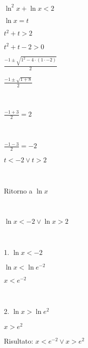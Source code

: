 \documentclass[11pt]{article}
\begin{document}
$ \ln^2{x} + \ln{x} < 2 $

$ \ln{x} = t $

$ t^2 + t > 2 $

$ t^2 + t -2 > 0 $

$ \frac{-1 \pm \sqrt{1^2 - 4 \cdot (1 \cdot - 2)}}{2} $

$ \frac{-1 \pm \sqrt{1 + 8}}{2} $

\,

$ \frac{-1 + 3}{2} = 2 $

\,

$ \frac{-1 - 3}{2} = -2 $

$ t < -2 \vee t > 2 $

\,

\pagebreak

Ritorno a $ \ln{x} $

\,

$ \ln{x} < -2 \vee \ln{x} > 2 $

\, 

1. $ \ln{x} < -2 $

$ \ln{x} < \ln{e^{-2}} $

$ x < e^{-2} $

\, 

2. $ \ln{x} > \ln{e^2} $

$ x > e^2 $

Risultato: $ x < e^{-2} \vee x > e^2 $
\pagebreak
\end{document}
